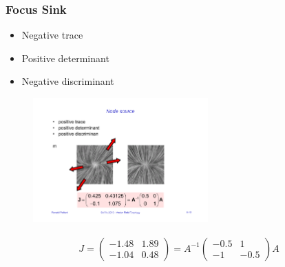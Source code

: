 \subsubsection{Focus Sink}
\begin{itemize}
    \item Negative trace
    \item Positive determinant
    \item Negative discriminant
\end{itemize}
\begin{figure}[H]
    \centering
    \includegraphics[width=0.6\textwidth,page=5]{img/08_2d_critical_points}
\end{figure}
\begin{align*}
J = \begin{pmatrix}
     -1.48 & 1.89\\
     -1.04 & 0.48
 \end{pmatrix}
 = A ^{-1} 
     \begin{pmatrix}
         -0.5 & 1\\
         -1 & -0.5
     \end{pmatrix}A
\end{align*}


